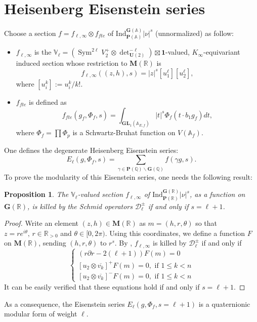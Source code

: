 \documentclass[12pt]{article}
\newtheorem{prop}[thm]{Proposition}
\theoremstyle{remark}
\theoremstyle{definition}
\newcommand{\sym}{\operatorname{Sym}}
\newcommand{\oo}{\mathcal{O}}
\newcommand{\Z}{\mathbb{Z}}
\newcommand{\Q}{\mathbb{Q}}
\newcommand{\R}{\mathbb{R}}
\newcommand{\A}{\mathbb{A}}
\newcommand{\rmm}[1]{\mathrm{#1}}
\newcommand{\bff}[1]{\mathbf{#1}}
\newcommand{\call}[1]{\mathcal{#1}}
\newcommand{\mbb}[1]{\mathbb{#1}}
\newcommand{\GL}{\mathbf{GL}}
\begin{document}
\section{Heisenberg Eisenstein series}
Choose a section $f=f_{\ell,\infty}\otimes f_{fte}$ of $\rmm{Ind}_{\bff{P}(\A)}^{\bff{G}(\A)}|\nu|^{s}$ (unnormalized) as follow:
\begin{itemize}
    \item $f_{\ell,\infty}$ is the $\mbb{V}_{\ell}=\left(\sym^{2\ell}V_{2}^{+}\otimes \det^{-\ell}_{\bff{U}(2)}\right)\boxtimes\bff{1}$-valued, $K_{\infty}$-equivariant induced section
    whose restriction to $\bff{M}(\R)$ is 
    \[f_{\ell,\infty}((z,h),s)=|z|^{s}[u_{1}^{\ell}][u_{2}^{\ell}],\]
    where $[u_{i}^{k}]:=u_{i}^{k}/k!$.
    \item $f_{fte}$ is defined as 
    \[f_{fte}(g_{f},\Phi_{f},s)=\int_{\GL_{1}(\A_{E,f})}|t|^{s}\Phi_{f}(t\cdot b_{1}g_{f})dt,\]
    where $\Phi_{f}=\prod \Phi_{p}$ is a Schwartz-Bruhat function on $V(\A_{f})$.
\end{itemize}
One defines the degenerate Heisenberg Eisenstein series: 
\[E_{\ell}(g,\Phi_{f},s)=\sum_{\gamma\in \bff{P}(\Q)\backslash \bff{G}(\Q)}f(\gamma g,s).\]
To prove the modularity of this Eisenstein series,
one needs the following result:
\begin{prop}\label{prop archimedean section killed by Schmid operators}
    The $\mbb{V}_{\ell}$-valued section $f_{\ell,\infty}$ of $\rmm{Ind}_{\bff{P}(\R)}^{\bff{G}(\R)}|\nu|^{s}$,
    as a function on $\bff{G}(\R)$,
    is killed by the Schmid operators $\call{D}_{\ell}^{\pm}$
    if and only if $s=\ell+1$.
\end{prop}
\begin{proof}
    Write an element $(z,h)\in\bff{M}(\R)$ as $m=(h,r,\theta)$ so that $z=re^{i\theta},\,r\in\R_{>0}$ and $\theta\in [0,2\pi)$.
    Using this coordinates,
    we define a function $F$ on $\bff{M}(\R)$,
    sending $(h,r,\theta)$ to $r^{s}$.
    By \cite[Proposition 3.10]{Hilado_McGlade_Yan_Fourier_coefficients_unitary_group},
    $f_{\ell,\infty}$ is killed by $\call{D}_{\ell}^{\pm}$ if and only if 
    \[\left\{\begin{array}{l}
            (r\partial r-2(\ell+1))F(m)=0\\[6pt]
            [u_{2}\otimes\overline{v_{k}}]^{+}F(m)=0,\text{ if } 1 \leq k<n\\[6pt]
            [u_{2}\otimes\overline{v_{k}}]^{-}F(m)=0,\text{ if }1\leq k<n
        \end{array}\right.\]
    It can be easily verified that these equations hold if and only if $s=\ell+1$.
\end{proof}
As a consequence,
the Eisenstein series $E_{\ell}(g,\Phi_{f},s=\ell+1)$ is a quaternionic modular form of weight $\ell$.
\end{document}
